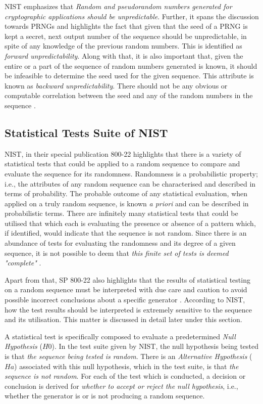 NIST emphasizes that \textit{Random and pseudorandom numbers generated for cryptographic applications should be unpredictable}\cite{rep_nist_sp_80022}. Further, it spans the discussion towards PRNGs and highlights the fact that given that the seed of a PRNG is kept a secret, next output number of the sequence should be unpredictable, in spite of any knowledge of the previous random numbers. This is identified as \textit{forward unpredictability}. Along with that, it is also important that, given the entire or a part of the sequence of random numbers generated is known, it should be infeasible to determine the seed used for the given sequence. This attribute is known as \textit{backward unpredictability}. There should not be any obvious or computable correlation between the seed and any of the random numbers in the sequence \cite{rep_nist_sp_80022}.

\subsection{Statistical Tests Suite of NIST}

NIST, in their special publication 800-22 highlights that there is a variety of statistical tests that could be applied to a random sequence to compare and evaluate the sequence for its randomness. Randomness is a probabilistic property; i.e., the attributes of any random sequence can be characterised and described in terms of probability. The probable outcome of any statistical evaluation, when applied on a truly random sequence, is known \textit{a priori} and can be described in probabilistic terms. There are infinitely many statistical tests that could be utilised that which each is evaluating the presence or absence of a pattern which, if identified, would indicate that the sequence is not random. Since there is an abundance of tests for evaluating the randomness and its degree of a given sequence, it is not possible to deem that \textit{this finite set of tests is deemed "complete"} \cite{rep_nist_sp_80022}.

Apart from that, SP 800-22 also highlights that the results of statistical testing on a random sequence must be interpreted with due care and caution to avoid possible incorrect conclusions about a specific generator \cite{rep_nist_sp_80022}. According to NIST, how the test results should be interpreted is extremely sensitive to the sequence and its utilisation. This matter is discussed in detail later under this section.

A statistical test is specifically composed to evaluate a predetermined \textit{Null Hypothesis} ($H0$). In the test suite given by NIST, the null hypothesis being tested is that \textit{the sequence being tested is random}. There is an \textit{Alternative Hypothesis} ($Ha$) associated with this null hypothesis, which in the test suite, is that \textit{the sequence is not random}. For each of the test which is conducted, a decision or conclusion is derived for \textit{whether to accept or reject the null hypothesis}, i.e., whether the generator is or is not producing a random sequence.

